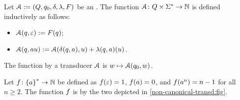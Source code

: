 \begin{definition}
    Let $\mathcal{A} \mathrel{:=} (Q,q_0, \delta, \lambda, F)$ be an .
    The function
    $\mathcal{A} \colon Q \times \Sigma^* \to \mathbb{N}$
    is defined inductively  as follows:
    \begin{itemize}
        \item $\mathcal{A}(q, \varepsilon) \mathrel{:=} F(q)$;
        \item $\mathcal{A}(q, a u) \mathrel{:=} \mathcal{A}(\delta(q,a), u)
            + \lambda(q,a)(u)$.
    \end{itemize}
    The function  by a transducer $\mathcal{A}$
    is $w \mapsto \mathcal{A}(q_0, w)$.
\end{definition}


\begin{example}
    \label{non-canonical-transd:ex}
    Let $\BadExOk \colon \set{a}^* \to \Nat$
    be defined as
    $\BadExOk(\varepsilon) = 1$,
    $\BadExOk(a) = 0$,
    and $\BadExOk(a^n) = n - 1$ for all $n \geq 2$.
    The function $\BadExOk$ is  by the two 
    depicted in \cref{non-canonical-transd:fig}.
\end{example}

